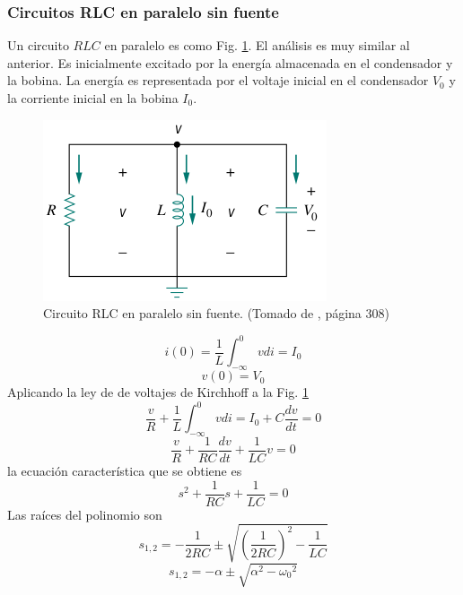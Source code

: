 \documentclass[twocolumn]{IEEEtran}
\begin{document}
\subsubsection{Circuitos RLC en paralelo sin fuente}
\noindent
Un circuito $RLC$ en paralelo es como Fig. \ref{rlcparalelo}. El análisis es muy similar al anterior. Es inicialmente excitado por la energía almacenada en el condensador y la bobina. La energía es representada por el voltaje inicial en el condensador $V_0$ y la corriente inicial en la bobina $I_0$.
\begin{figure}[H]
	\centering
		\includegraphics[scale=0.5]{rlcparalelo.png}
	\caption{Circuito RLC en paralelo sin fuente. (Tomado de \cite{sadiku}, página 308)}
	\label{rlcparalelo}
\end{figure}
\begin{equation}
 i\left( 0 \right) = \frac{1}{L}\int_{ - \infty }^0 {vdi = {I_0}} 
\end{equation}
\begin{equation}
 v\left( 0 \right) = V_0
\end{equation}
\noindent
Aplicando la ley de de voltajes de Kirchhoff a la Fig. \ref{rlcparalelo}
\begin{equation}
\frac{v}{R}  + \frac{1}{L}\int_{ - \infty }^0 {vdi = {I_0}} + C\frac{dv}{dt} = 0
\end{equation}
\begin{equation}
 \frac{v}{R} + \frac{1}{{RC}}\frac{{dv}}{{dt}} + \frac{1}{{LC}}v = 0
\end{equation}
\noindent
la ecuación característica que se obtiene es
\begin{equation}
 s^2 + \frac{1}{RC}s +  \frac{1}{LC} = 0
\end{equation}
\noindent
Las raíces del polinomio son
\begin{equation}
 {s_{1,2}} =  - \frac{1}{{2RC}} \pm \sqrt {{{\left( {\frac{1}{{2RC}}} \right)}^2} - \frac{1}{{LC}}} 
\end{equation}
\begin{equation}
 {s_{1,2}} =  - \alpha \pm \sqrt {{{ \alpha ^2} - {\omega _0}^2}} 
\end{equation}
\end{document}
